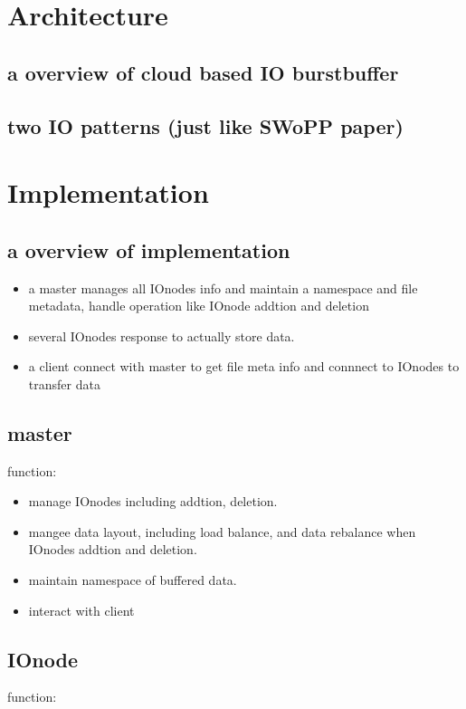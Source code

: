 \documentclass{article}
\begin{document}
\section{Architecture}
\subsection{a overview of cloud based IO burstbuffer}
\subsection{two IO patterns (just like SWoPP paper)}

\section{Implementation}
\subsection{a overview of implementation}
\begin{itemize}
	\item a master manages all IOnodes info and maintain a namespace and file metadata, handle operation like IOnode addtion and deletion
	\item several IOnodes response to actually store data.
	\item a client connect with master to get file meta info and connnect to IOnodes to transfer data
\end{itemize}

\subsection{master}
function:

	\begin{itemize}
		\item manage IOnodes including addtion, deletion.
		\item mangee data layout, including load balance, and data rebalance when IOnodes addtion and deletion.
		\item maintain namespace of buffered data.
		\item interact with client
	\end{itemize}

\subsection{IOnode}
function:
\end{document}
